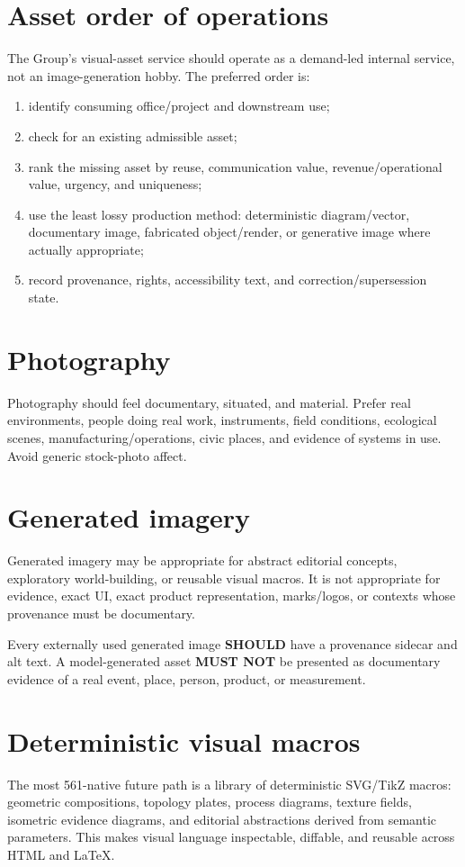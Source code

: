 \documentclass[11pt,twoside,openany]{report}
\newcommand{\MUSTNOT}{\textbf{MUST NOT}\xspace}
\newcommand{\SHOULD}{\textbf{SHOULD}\xspace}
\begin{document}
\section{Asset order of operations}
The Group's visual-asset service should operate as a demand-led internal service, not an image-generation hobby. The preferred order is:
\begin{enumerate}
  \item identify consuming office/project and downstream use;
  \item check for an existing admissible asset;
  \item rank the missing asset by reuse, communication value, revenue/operational value, urgency, and uniqueness;
  \item use the least lossy production method: deterministic diagram/vector, documentary image, fabricated object/render, or generative image where actually appropriate;
  \item record provenance, rights, accessibility text, and correction/supersession state.
\end{enumerate}

\section{Photography}
Photography should feel documentary, situated, and material. Prefer real environments, people doing real work, instruments, field conditions, ecological scenes, manufacturing/operations, civic places, and evidence of systems in use. Avoid generic stock-photo affect.

\section{Generated imagery}
Generated imagery may be appropriate for abstract editorial concepts, exploratory world-building, or reusable visual macros. It is not appropriate for evidence, exact UI, exact product representation, marks/logos, or contexts whose provenance must be documentary.

\begin{specbox}
Every externally used generated image \SHOULD have a provenance sidecar and alt text. A model-generated asset \MUSTNOT be presented as documentary evidence of a real event, place, person, product, or measurement.
\end{specbox}

\section{Deterministic visual macros}
The most 561-native future path is a library of deterministic SVG/TikZ macros: geometric compositions, topology plates, process diagrams, texture fields, isometric evidence diagrams, and editorial abstractions derived from semantic parameters. This makes visual language inspectable, diffable, and reusable across HTML and LaTeX.
\end{document}
